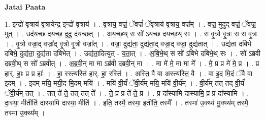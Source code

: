 \documentclass[17pt]{extarticle}
\begin{document}
\textbf{Jatai Paata} \newline

1. इन्द्रो॑ वृ॒त्राय॑ वृ॒त्रायेन्द्र॒ इन्द्रो॑ वृ॒त्राय॑ । . वृ॒त्राय॒ वज्रं॒ ॅवज्रं॑ ॅवृ॒त्राय॑ वृ॒त्राय॒ वज्र᳚म् । . वज्र॒ मुदुद् वज्रं॒ ॅवज्र॒ मुत् । . उद॑यच्छ दयच्छ॒ दुदु द॑यच्छत् । . अ॒य॒च्छ॒थ् स सो॑ ऽयच्छ दयच्छ॒थ् सः । . स वृ॒त्रो वृ॒त्रः स स वृ॒त्रः । . वृ॒त्रो वज्रा॒द् वज्रा᳚द् वृ॒त्रो वृ॒त्रो वज्रा᳚त् । . वज्रा॒ दुद्य॑ता॒ दुद्य॑ता॒द् वज्रा॒द् वज्रा॒ दुद्य॑तात् । . उद्य॑ता दबिभे दबिभे॒ दुद्य॑ता॒ दुद्य॑ता दबिभेत् । . उद्य॑ता॒दित्युत् - य॒ता॒त् । . अ॒बि॒भे॒थ् स सो॑ ऽबिभे दबिभे॒थ् सः । . सो᳚ ऽब्रवी दब्रवी॒थ् स सो᳚ ऽब्रवीत् । . अ॒ब्र॒वी॒न् मा मा ऽब्र॑वी दब्रवी॒न् मा । . मा मे॑ मे॒ मा मा मे᳚ । . मे॒ प्र प्र मे॑ मे॒ प्र । . प्र हार्॑. हाः॒ प्र प्र हाः᳚ । . हा॒ रस्त्यस्ति॑ हार्. हा॒ रस्ति॑ । . अस्ति॒ वै वा अस्त्यस्ति॒ वै । . वा इ॒द मि॒दं ॅवै वा इ॒दम् । . इ॒दम् मयि॒ मयी॒द मि॒दम् मयि॑ । . मयि॑ वी॒र्यं॑ ॅवी॒र्य॑म् मयि॒ मयि॑ वी॒र्य᳚म् । . वी॒र्य॑म् तत् तद् वी॒र्यं॑ ॅवी॒र्य॑म् तत् । . तत् ते॑ ते॒ तत् तत् ते᳚ । . ते॒ प्र प्र ते॑ ते॒ प्र । . प्र दा᳚स्यामि दास्यामि॒ प्र प्र दा᳚स्यामि । . दा॒स्या॒ मीतीति॑ दास्यामि दास्या॒ मीति॑ । . इति॒ तस्मै॒ तस्मा॒ इतीति॒ तस्मै᳚ । . तस्मा॑ उ॒क्थ्य॑ मु॒क्थ्य॑म् तस्मै॒ तस्मा॑ उ॒क्थ्य᳚म् । \newline
\end{document}
